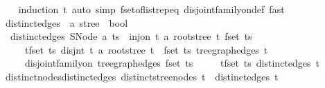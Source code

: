 \begin{isabellebody}
%
\isadelimproof
\ \ %
\endisadelimproof
%
\isatagproof
{}\isamarkupfalse%
\ {\isacharparenleft}{\kern0pt}induction\ t{\isacharparenright}{\kern0pt}\ {\isacharparenleft}{\kern0pt}auto\ simp{\isacharcolon}{\kern0pt}\ fset{\isacharunderscore}{\kern0pt}of{\isacharunderscore}{\kern0pt}list{\isachardot}{\kern0pt}rep{\isacharunderscore}{\kern0pt}eq\ disjoint{\isacharunderscore}{\kern0pt}family{\isacharunderscore}{\kern0pt}on{\isacharunderscore}{\kern0pt}def{\isacharcomma}{\kern0pt}\ fast{\isacharparenright}{\kern0pt}%
\endisatagproof
{\isafoldproof}%
%
\isadelimproof
\isanewline
%
\endisadelimproof
\isanewline
{}\isamarkupfalse%
\ distinct{\isacharunderscore}{\kern0pt}edges\ {\isacharcolon}{\kern0pt}{\isacharcolon}{\kern0pt}\ {\isachardoublequoteopen}{\isacharprime}{\kern0pt}a\ stree\ {\isasymRightarrow}\ bool{\isachardoublequoteclose}\ \isanewline
\ \ {\isachardoublequoteopen}distinct{\isacharunderscore}{\kern0pt}edges\ {\isacharparenleft}{\kern0pt}SNode\ a\ ts{\isacharparenright}{\kern0pt}\ {\isasymlongleftrightarrow}\ inj{\isacharunderscore}{\kern0pt}on\ {\isacharparenleft}{\kern0pt}{\isasymlambda}t{\isachardot}{\kern0pt}\ {\isacharbraceleft}{\kern0pt}a{\isacharcomma}{\kern0pt}\ root{\isacharunderscore}{\kern0pt}stree\ t{\isacharbraceright}{\kern0pt}{\isacharparenright}{\kern0pt}\ {\isacharparenleft}{\kern0pt}fset\ ts{\isacharparenright}{\kern0pt}\isanewline
\ \ \ \ {\isasymand}\ {\isacharparenleft}{\kern0pt}{\isasymforall}t{\isasymin}fset\ ts{\isachardot}{\kern0pt}\ disjnt\ {\isacharparenleft}{\kern0pt}{\isacharparenleft}{\kern0pt}{\isasymlambda}t{\isachardot}{\kern0pt}\ {\isacharbraceleft}{\kern0pt}a{\isacharcomma}{\kern0pt}\ root{\isacharunderscore}{\kern0pt}stree\ t{\isacharbraceright}{\kern0pt}{\isacharparenright}{\kern0pt}\ {\isacharbackquote}{\kern0pt}\ fset\ ts{\isacharparenright}{\kern0pt}\ {\isacharparenleft}{\kern0pt}tree{\isacharunderscore}{\kern0pt}graph{\isacharunderscore}{\kern0pt}edges\ t{\isacharparenright}{\kern0pt}{\isacharparenright}{\kern0pt}\isanewline
\ \ \ \ {\isasymand}\ disjoint{\isacharunderscore}{\kern0pt}family{\isacharunderscore}{\kern0pt}on\ tree{\isacharunderscore}{\kern0pt}graph{\isacharunderscore}{\kern0pt}edges\ {\isacharparenleft}{\kern0pt}fset\ ts{\isacharparenright}{\kern0pt}\isanewline
\ \ \ \ {\isasymand}\ {\isacharparenleft}{\kern0pt}{\isasymforall}t{\isasymin}fset\ ts{\isachardot}{\kern0pt}\ distinct{\isacharunderscore}{\kern0pt}edges\ t{\isacharparenright}{\kern0pt}{\isachardoublequoteclose}\isanewline
\isanewline
{}\isamarkupfalse%
\ distinct{\isacharunderscore}{\kern0pt}nodes{\isacharunderscore}{\kern0pt}distinct{\isacharunderscore}{\kern0pt}edges{\isacharcolon}{\kern0pt}\ {\isachardoublequoteopen}distinct{\isacharunderscore}{\kern0pt}stree{\isacharunderscore}{\kern0pt}nodes\ t\ {\isasymLongrightarrow}\ distinct{\isacharunderscore}{\kern0pt}edges\ t{\isachardoublequoteclose}\isanewline

\end{isabellebody}
